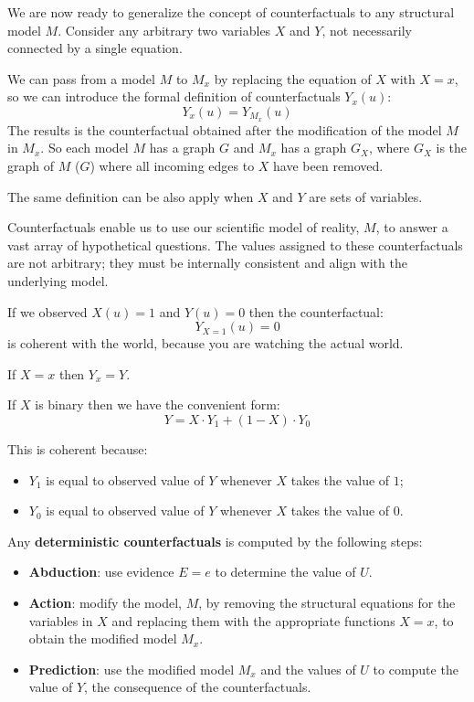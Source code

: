 We are now ready to generalize the concept of counterfactuals to any structural
model $M$. Consider any arbitrary two variables $X$ and $Y$, not necessarily
connected by a single equation.

We can pass from a model $M$ to $M_x$ by replacing the equation of $X$ with $X = x$,
so we can introduce the formal definition of counterfactuals $Y_x (u)$:
\begin{equation}
    Y_x (u) = Y_{M_x}(u)
\end{equation}
The results is the counterfactual obtained after the modification of the model
$M$ in $M_x$. So each model $M$ has a graph $G$ and $M_x$ has a graph $G_X$, where
$G_X$ is the graph of $M$ ($G$) where all incoming edges to $X$ have been removed.

The same definition can be also apply when $X$ and $Y$ are sets of variables.

Counterfactuals enable us to use our scientific model of reality, $M$, to answer
a vast array of hypothetical questions. The values assigned to these counterfactuals
are not arbitrary; they must be internally consistent and align with the underlying model.

\begin{note}
    If we observed $X(u) = 1$ and $Y(u) = 0$ then the counterfactual:
    \begin{equation*}
        Y_{X=1}(u) = 0
    \end{equation*}
    is coherent with the world, because you are watching the actual world.
\end{note}

\begin{definition}
    If $X = x$ then $Y_x = Y$.

    If $X$ is binary then we have the convenient form:
    \begin{equation}
        Y = X \cdot Y_1 + (1 - X) \cdot Y_0
    \end{equation}
\end{definition}
This is coherent because:
\begin{itemize}
    \item $Y_1$ is equal to observed value of $Y$ whenever $X$ takes the value of $1$;
    \item $Y_0$ is equal to observed value of $Y$ whenever $X$ takes the value of $0$.
\end{itemize}

Any \textbf{deterministic counterfactuals} is computed by the following steps:
\begin{itemize}
    \item \textbf{Abduction}: use evidence $E = e$ to determine the value of $U$.
    \item \textbf{Action}: modify the model, $M$, by removing the structural
          equations for the variables in $X$ and replacing them with the appropriate
          functions $X = x$, to obtain the modified model $M_x$.
    \item \textbf{Prediction}: use the modified model $M_x$ and the values of $U$
          to compute the value of $Y$, the consequence of the counterfactuals.
\end{itemize}

